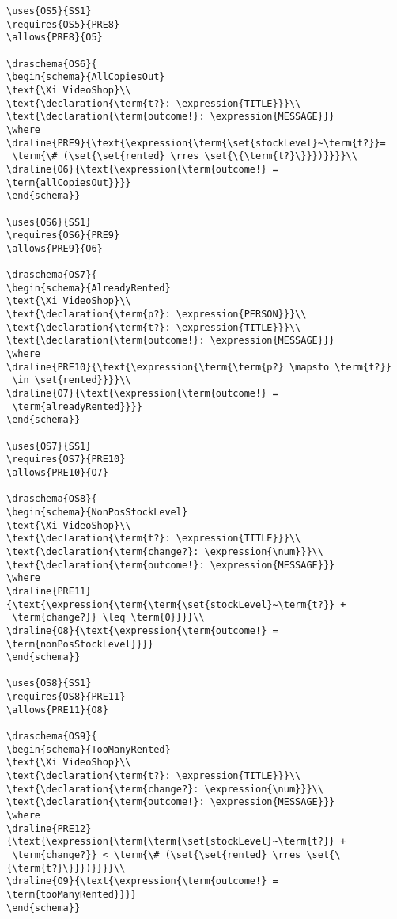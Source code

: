 \begin{verbatim}
\uses{OS5}{SS1}
\requires{OS5}{PRE8}
\allows{PRE8}{O5}

\draschema{OS6}{
\begin{schema}{AllCopiesOut}
\text{\Xi VideoShop}\\
\text{\declaration{\term{t?}: \expression{TITLE}}}\\
\text{\declaration{\term{outcome!}: \expression{MESSAGE}}}
\where
\draline{PRE9}{\text{\expression{\term{\set{stockLevel}~\term{t?}}=
 \term{\# (\set{\set{rented} \rres \set{\{\term{t?}\}}})}}}}\\
\draline{O6}{\text{\expression{\term{outcome!} = \term{allCopiesOut}}}}
\end{schema}}

\uses{OS6}{SS1}
\requires{OS6}{PRE9}
\allows{PRE9}{O6}

\draschema{OS7}{
\begin{schema}{AlreadyRented}
\text{\Xi VideoShop}\\
\text{\declaration{\term{p?}: \expression{PERSON}}}\\
\text{\declaration{\term{t?}: \expression{TITLE}}}\\
\text{\declaration{\term{outcome!}: \expression{MESSAGE}}}
\where
\draline{PRE10}{\text{\expression{\term{\term{p?} \mapsto \term{t?}}
 \in \set{rented}}}}\\
\draline{O7}{\text{\expression{\term{outcome!} =
 \term{alreadyRented}}}}
\end{schema}}

\uses{OS7}{SS1}
\requires{OS7}{PRE10}
\allows{PRE10}{O7}

\draschema{OS8}{
\begin{schema}{NonPosStockLevel}
\text{\Xi VideoShop}\\
\text{\declaration{\term{t?}: \expression{TITLE}}}\\
\text{\declaration{\term{change?}: \expression{\num}}}\\
\text{\declaration{\term{outcome!}: \expression{MESSAGE}}}
\where
\draline{PRE11}{\text{\expression{\term{\term{\set{stockLevel}~\term{t?}} +
 \term{change?}} \leq \term{0}}}}\\
\draline{O8}{\text{\expression{\term{outcome!} = \term{nonPosStockLevel}}}}
\end{schema}}

\uses{OS8}{SS1}
\requires{OS8}{PRE11}
\allows{PRE11}{O8}

\draschema{OS9}{
\begin{schema}{TooManyRented}
\text{\Xi VideoShop}\\
\text{\declaration{\term{t?}: \expression{TITLE}}}\\
\text{\declaration{\term{change?}: \expression{\num}}}\\
\text{\declaration{\term{outcome!}: \expression{MESSAGE}}}
\where
\draline{PRE12}{\text{\expression{\term{\term{\set{stockLevel}~\term{t?}} +
 \term{change?}} < \term{\# (\set{\set{rented} \rres \set{\{\term{t?}\}}})}}}}\\
\draline{O9}{\text{\expression{\term{outcome!} = \term{tooManyRented}}}}
\end{schema}}


\end{verbatim}
